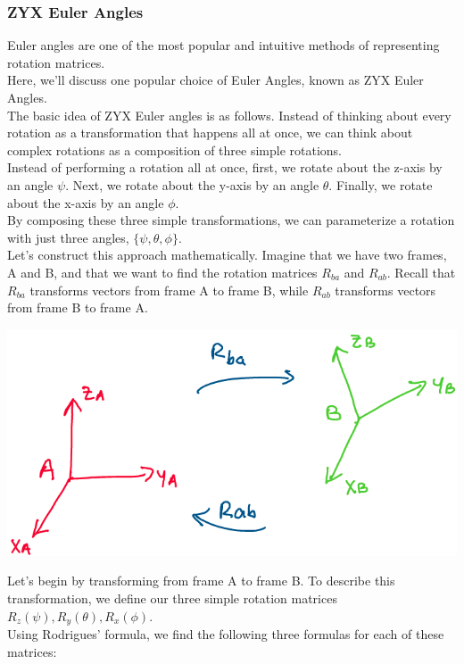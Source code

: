 \documentclass[oneside]{book}
\begin{document}
\subsubsection{ZYX Euler Angles}
Euler angles are one of the most popular and intuitive methods of representing rotation matrices.\\
Here, we'll discuss one popular choice of Euler Angles, known as ZYX Euler Angles.\\
The basic idea of ZYX Euler angles is as follows. Instead of thinking about every rotation as a transformation that happens all at once, we can think about complex rotations as a composition of three simple rotations.\\
Instead of performing a rotation all at once, first, we rotate about the z-axis by an angle $\psi$. Next, we rotate about the y-axis by an angle $\theta$. Finally, we rotate about the x-axis by an angle $\phi$.\\
By composing these three simple transformations, we can parameterize a rotation with just three angles, $\{\psi, \theta, \phi\}$.\\
Let's construct this approach mathematically. Imagine that we have two frames, A and B, and that we want to find the rotation matrices $R_{ba}$ and $R_{ab}$. Recall that $R_{ba}$ transforms vectors from frame A to frame B, while $R_{ab}$ transforms vectors from frame B to frame A.
\begin{center}
    \includegraphics[scale=0.3]{images/eulertransf.png}
\end{center}
Let's begin by transforming from frame A to frame B. To describe this transformation, we define our three simple rotation matrices $R_z(\psi), R_y(\theta), R_x(\phi)$.\\
Using Rodrigues' formula, we find the following three formulas for each of these matrices:
\end{document}
